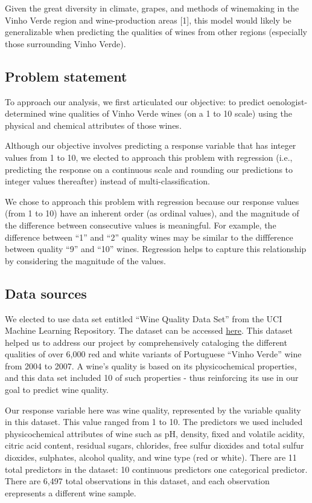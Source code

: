 \documentclass[
  letterpaper,
  DIV=11,
  numbers=noendperiod]{scrartcl}
\begin{document}
Given the great diversity in climate, grapes, and methods of winemaking
in the Vinho Verde region and wine-production areas {[}1{]}, this model
would likely be generalizable when predicting the qualities of wines
from other regions (especially those surrounding Vinho Verde).

\hypertarget{problem-statement}{%
\subsection{Problem statement}\label{problem-statement}}

To approach our analysis, we first articulated our objective: to predict
oenologist-determined wine qualities of Vinho Verde wines (on a 1 to 10
scale) using the physical and chemical attributes of those wines.

Although our objective involves predicting a response variable that has
integer values from 1 to 10, we elected to approach this problem with
regression (i.e., predicting the response on a continuous scale and
rounding our predictions to integer values thereafter) instead of
multi-classification.

We chose to approach this problem with regression because our response
values (from 1 to 10) have an inherent order (as ordinal values), and
the magnitude of the difference between consecutive values is
meaningful. For example, the difference between ``1'' and ``2'' quality
wines may be similar to the diffference between quality ``9'' and ``10''
wines. Regression helps to capture this relationship by considering the
magnitude of the values.

\hypertarget{data-sources}{%
\subsection{Data sources}\label{data-sources}}

We elected to use data set entitled ``Wine Quality Data Set'' from the
UCI Machine Learning Repository. The dataset can be accessed
\href{https://archive.ics.uci.edu/ml/datasets/Wine+Quality}{here}. This
dataset helped us to address our project by comprehensively cataloging
the different qualities of over 6,000 red and white variants of
Portuguese ``Vinho Verde'' wine from 2004 to 2007. A wine's quality is
based on its physicochemical properties, and this data set included 10
of such properties - thus reinforcing its use in our goal to predict
wine quality.

Our response variable here was wine quality, represented by the variable
quality in this dataset. This value ranged from 1 to 10. The predictors
we used included physicochemical attributes of wine such as pH, density,
fixed and volatile acidity, citric acid content, residual sugars,
chlorides, free sulfur dioxides and total sulfur dioxides, sulphates,
alcohol quality, and wine type (red or white). There are 11 total
predictors in the dataset: 10 continuous predictors one categorical
predictor. There are 6,497 total observations in this dataset, and each
observation erepresents a different wine sample.
\end{document}
